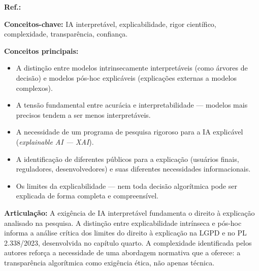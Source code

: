 \begin{fichamento}
    \textbf{Ref.:} \cite{DoshiVelez2017TMI}
    
    \textbf{Conceitos-chave:} IA interpretável, explicabilidade, rigor científico, complexidade, transparência, confiança.
    
    \textbf{Conceitos principais:}
    \begin{itemize}
        \item A distinção entre modelos intrinsecamente interpretáveis (como árvores de decisão) e modelos pós-hoc explicáveis (explicações externas a modelos complexos).
        \item A tensão fundamental entre acurácia e interpretabilidade — modelos mais precisos tendem a ser menos interpretáveis.
        \item A necessidade de um programa de pesquisa rigoroso para a IA explicável (\textit{explainable AI — XAI}).
        \item A identificação de diferentes públicos para a explicação (usuários finais, reguladores, desenvolvedores) e suas diferentes necessidades informacionais.
        \item Os limites da explicabilidade — nem toda decisão algorítmica pode ser explicada de forma completa e compreensível.
    \end{itemize}
    
    \textbf{Articulação:} A exigência de IA interpretável fundamenta o direito à explicação analisado na pesquisa. A distinção entre explicabilidade intrínseca e pós-hoc informa a análise crítica dos limites do direito à explicação na LGPD e no PL 2.338/2023, desenvolvida no capítulo quarto. A complexidade identificada pelos autores reforça a necessidade de uma abordagem normativa que a \MH{} oferece: a transparência algorítmica como exigência ética, não apenas técnica.
\end{fichamento}

